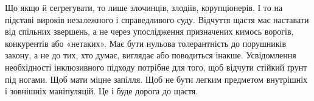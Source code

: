 Що якщо й сегрегувати, то лише злочинців, злодіїв, корупціонерів. І то на
підставі вироків незалежного і справедливого суду. Відчуття щастя має наставати
від спільних звершень, а не через упослідження призначених кимось ворогів,
конкурентів або «нетаких». Має бути нульова толерантність до порушників закону,
а не до тих, хто думає, виглядає або поводиться інакше. Усвідомлення
необхідності інклюзивного підходу потрібне для того, щоб відчути стійкий ґрунт
під ногами. Щоб мати міцне запілля. Щоб не бути легким предметом внутрішніх і
зовнішніх маніпуляцій. Це і буде дорога до щастя.
